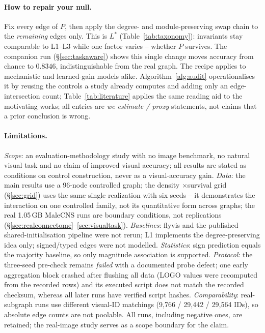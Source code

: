 \documentclass[10pt,twocolumn,letterpaper]{article}
\begin{document}
\paragraph{How to repair your null.}\label{sec:repair}
Fix every edge of $P$, then apply the degree- and module-preserving swap chain
to the \emph{remaining} edges only. This is $L^*$ (Table~\ref{tab:taxonomy}):
invariants stay comparable to L1--L3 while one factor varies -- whether $P$
survives. The companion run (\S\ref{sec:taskaware}) shows this single change
moves accuracy from chance to $0.8346$, indistinguishable from the real
graph. The recipe applies to mechanistic and learned-gain models alike.
Algorithm~\ref{alg:audit} operationalises it by reusing the controls a study
already computes and adding only an edge-intersection count;
Table~\ref{tab:literature} applies the same reading aid to the motivating
works; all entries are \emph{we estimate / proxy} statements, not claims that
a prior conclusion is wrong.

\paragraph{Limitations.}
\emph{Scope}: an evaluation-methodology study with no image benchmark, no
natural visual task and no claim of improved visual accuracy; all results are
stated as conditions on control construction, never as a visual-accuracy gain.
\emph{Data}: the main results use a 96-node controlled graph; the density
$\times$survival grid (\S\ref{sec:grid}) uses the same single realization with
six seeds -- it demonstrates the interaction on one controlled family, not its
quantitative form across graphs; the real 1.05\,GB MaleCNS runs are boundary
conditions, not replications (\S\ref{sec:realconnectome}--\ref{sec:visualtask}). \emph{Baselines}: flyvis and the published shared-initialisation pipeline
were not rerun; L1 implements the degree-preserving idea only; signed/typed
edges were not modelled.
\emph{Statistics}: sign prediction equals the majority baseline, so only
magnitude association is supported. \emph{Protocol}: the three-seed pre-check remains
\emph{failed} with a documented probe defect; one early aggregation block
crashed after flushing all data (LOGO values were recomputed from the recorded
rows) and its executed script does not match the recorded checksum, whereas
all later runs have verified script hashes. \emph{Comparability}: real-subgraph
runs use different visual-ID matchings (9{,}766 / 29{,}442 / 29{,}564 IDs), so
absolute edge counts are not poolable. All runs, including negative ones, are
retained; the real-image study serves as a scope boundary for the claim.
\end{document}
